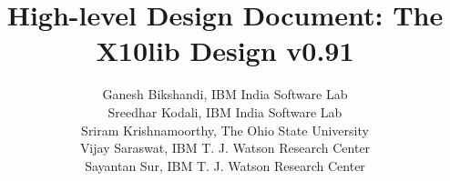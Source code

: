 \documentclass{article}
\def\Xtenlib{{\sf X10lib}}
\begin{document}
\title{High-level Design Document: The \Xtenlib{} Design v0.91}
\author{Ganesh Bikshandi, IBM India Software Lab\\
Sreedhar Kodali, IBM India Software Lab\\
Sriram Krishnamoorthy, The Ohio State University\\
Vijay Saraswat, IBM T. J. Watson Research Center\\
Sayantan Sur, IBM T. J. Watson Research Center}


\maketitle

\thispagestyle{fancy}







\end{document}
